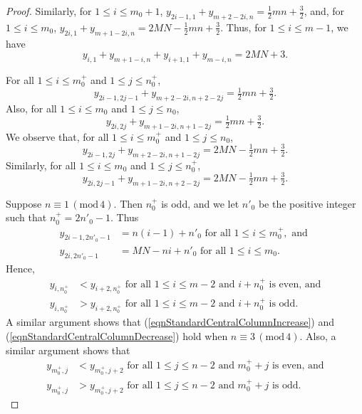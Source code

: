 \documentclass[12pt]{amsart}
\theoremstyle{definition}
\theoremstyle{plain}
\begin{document}
\begin{proof}
Similarly, for $1\leqslant i \leqslant m_0 +1$, $y_{2i-1,1} +y_{m+2-2i,n}=\tfrac{1}{2}mn+\tfrac{3}{2}$, and,
for $1\leqslant i \leqslant m_0$, $y_{2i,1} +y_{m+1-2i,n}=2MN- \tfrac{1}{2}mn+\tfrac{3}{2}$.
Thus, for $1\leqslant i \leqslant m-1$, we have
\begin{equation*}
  y_{i,1} +y_{m+1-i,n} +  y_{i+1,1} +y_{m-i,n} =2MN+3.
\end{equation*}

For all $1 \leqslant i \leqslant m^{+}_0$ and $1 \leqslant j \leqslant n^{+}_0$,
\begin{equation*}
  y_{2i-1,2j-1} + y_{m+2-2i,n+2-2j} = \tfrac{1}{2} mn + \tfrac{3}{2}.
\end{equation*}
Also, for all $1 \leqslant i \leqslant m_0$ and $1 \leqslant j \leqslant n_0$,
\begin{equation*}
  y_{2i,2j} + y_{m+1-2i,n+1-2j} = \tfrac{1}{2} mn + \tfrac{3}{2}.
\end{equation*}
We observe that, for all $1 \leqslant i \leqslant m^{+}_0$ and $1 \leqslant j \leqslant n_0$,
\begin{equation*}
  y_{2i-1,2j} + y_{m+2-2i,n+1-2j} = 2MN -\tfrac{1}{2} mn + \tfrac{3}{2}.
\end{equation*}
Similarly, for all $1 \leqslant i \leqslant m_0$ and $1 \leqslant j \leqslant n^{+}_0$,
\begin{equation*}
  y_{2i,2j-1} + y_{m+1-2i,n+2-2j} = 2MN -\tfrac{1}{2} mn + \tfrac{3}{2}.
\end{equation*}

Suppose $n\equiv 1\, (\mathrm{mod}\, 4)$. Then $n^{+}_0$ is odd, and we let $n'_0$ be the  positive integer such that $n^{+}_0=2n'_0 -1$.
Thus
\begin{align*}
  y_{2i-1,2n'_0 -1} &= n(i-1)+n'_0   \mbox{ \ for all }  1 \leqslant i \leqslant m^{+}_0, \mbox{ and } \\
  y_{2i,2n'_0 -1} &= MN - ni + n'_0    \mbox{ \ for all  } 1 \leqslant i \leqslant m_0.
\end{align*}
Hence,
\begin{align}
  y_{i,n_0^{+}} &<  y_{i+2,n_0^{+}} \mbox{ \ for all } 1 \leqslant i \leqslant m-2 \mbox{ and } i+ n^{+}_0 \mbox{ is even, and} \label{eqnStandardCentralColumnIncrease} \\
  y_{i,n_0^{+}} &>  y_{i+2,n_0^{+}} \mbox{ \ for all } 1 \leqslant i \leqslant m-2 \mbox{ and } i+ n^{+}_0 \mbox{ is odd.} \label{eqnStandardCentralColumnDecrease}
  \end{align}
A similar argument shows that (\ref{eqnStandardCentralColumnIncrease}) and (\ref{eqnStandardCentralColumnDecrease}) hold when $n\equiv 3\, (\mathrm{mod}\, 4)$.
Also, a similar argument shows that
    \begin{align*}
    y_{m_0^{+},j} &<  y_{m_0^{+},j+2} \mbox{ \ for all } 1 \leqslant j \leqslant n-2 \mbox{ and } m^{+}_0 +j \mbox{ is even, and} \\
    y_{m_0^{+},j} &>  y_{m_0^{+},j+2} \mbox{ \ for all } 1 \leqslant j \leqslant n-2 \mbox{ and } m^{+}_0 +j \mbox{ is odd.}
  \end{align*}
\end{proof}
\end{document}
